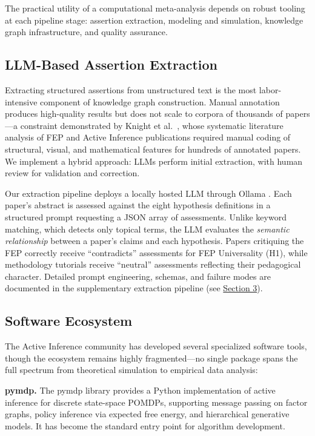 \documentclass[
]{article}
\begin{document}
The practical utility of a computational meta-analysis depends on robust
tooling at each pipeline stage: assertion extraction, modeling and
simulation, knowledge graph infrastructure, and quality assurance.

\subsection{LLM-Based Assertion
Extraction}\label{llm-based-assertion-extraction}

Extracting structured assertions from unstructured text is the most
labor-intensive component of knowledge graph construction. Manual
annotation produces high-quality results but does not scale to corpora
of thousands of papers---a constraint demonstrated by Knight et
al.~\citep{knight2022fep}, whose systematic literature analysis of FEP
and Active Inference publications required manual coding of structural,
visual, and mathematical features for hundreds of annotated papers. We
implement a hybrid approach: LLMs perform initial extraction, with human
review for validation and correction.

Our extraction pipeline deploys a locally hosted LLM through Ollama
\citep{ollama2024}. Each paper's abstract is assessed against the eight
hypothesis definitions in a structured prompt requesting a JSON array of
assessments. Unlike keyword matching, which detects only topical terms,
the LLM evaluates the \emph{semantic relationship} between a paper's
claims and each hypothesis. Papers critiquing the FEP correctly receive
``contradicts'' assessments for FEP Universality (H1), while methodology
tutorials receive ``neutral'' assessments reflecting their pedagogical
character. Detailed prompt engineering, schemas, and failure modes are
documented in the supplementary extraction pipeline (see
\hyperref[sec:extraction_pipeline]{Section 3}).

\subsection{Software Ecosystem}\label{software-ecosystem}

The Active Inference community has developed several specialized
software tools, though the ecosystem remains highly fragmented---no
single package spans the full spectrum from theoretical simulation to
empirical data analysis:

\textbf{pymdp.} The pymdp library \citep{heins2022pymdp} provides a
Python implementation of active inference for discrete state-space
POMDPs, supporting message passing on factor graphs, policy inference
via expected free energy, and hierarchical generative models. It has
become the standard entry point for algorithm development.
\end{document}

